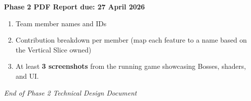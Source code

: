 \documentclass[12pt,a4paper]{article}
\begin{document}
\begin{warningbox}
\textbf{Phase 2 PDF Report due: 27 April 2026}
\end{warningbox}

\begin{enumerate}[leftmargin=*, itemsep=4pt]
  \item Team member names and IDs
  \item Contribution breakdown per member (map each feature to a name based on the Vertical Slice owned)
  \item At least \textbf{3 screenshots} from the running game showcasing Bosses, shaders, and UI.
\end{enumerate}

\vspace{1em}
\begin{center}

\vspace{0.4em}
\textit{\textcolor{MidGray}{End of Phase 2 Technical Design Document}}
\end{center}
\end{document}

